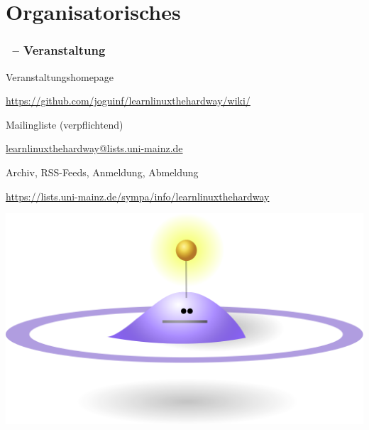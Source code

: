 \documentclass[utf8]{beamer}
\begin{document}
\begin{frame}
\end{frame}

\section{Organisatorisches}

\begin{frame}
  \frametitle{\insertsectionhead\ -- Veranstaltung}  
  
  \begin{block}{Veranstaltungshomepage}
  \begin{center}\url{https://github.com/joguinf/learnlinuxthehardway/wiki/}\end{center}
  \end{block}
  
  \begin{block}{Mailingliste (verpflichtend)}
  \begin{center}\url{learnlinuxthehardway@lists.uni-mainz.de}\end{center}
  \end{block}
  
  \begin{block}{Archiv, RSS-Feeds, Anmeldung, Abmeldung}
  \begin{center} \url{https://lists.uni-mainz.de/sympa/info/learnlinuxthehardway} \end{center}
  \end{block}
  \begin{center}  
  \includegraphics[scale=0.2]{znurt.png}
  \end{center}
\end{frame}
\end{document}

